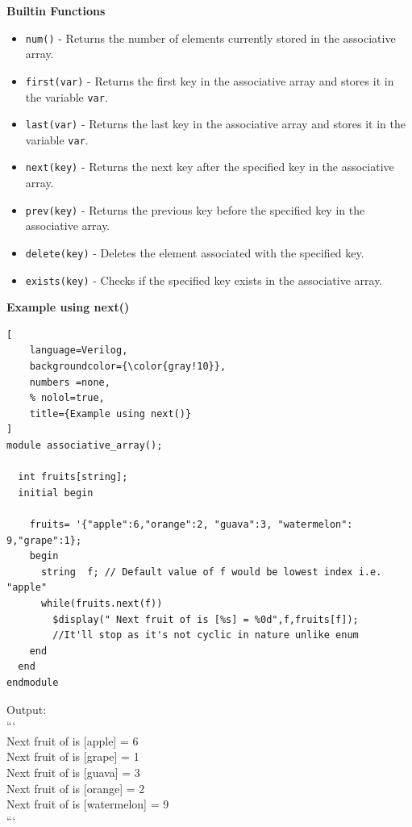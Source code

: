 \documentclass[12pt, a4paper]{article}
\begin{document}
\textbf{Builtin Functions}
\vspace{0.2em}
\begin{itemize}[nosep]
    \item \texttt{num()} - Returns the number of elements currently stored in the associative array.
    \item \texttt{first(var)} - Returns the first key in the associative array and stores it in the variable \texttt{var}.
    \item \texttt{last(var)} - Returns the last key in the associative array and stores it in the variable \texttt{var}.
    \item \texttt{next(key)} - Returns the next key after the specified key in the associative array.
    \item \texttt{prev(key)} - Returns the previous key before the specified key in the associative array.
    \item \texttt{delete(key)} - Deletes the element associated with the specified key.
    \item \texttt{exists(key)} - Checks if the specified key exists in the associative array.
\end{itemize}

\textbf{Example using next()}

\begin{lstlisting}[
    language=Verilog,
    backgroundcolor={\color{gray!10}},
    numbers =none,
    % nolol=true,
    title={Example using next()}
]
module associative_array();

  int fruits[string];  
  initial begin
    
    fruits= '{"apple":6,"orange":2, "guava":3, "watermelon": 9,"grape":1};
    begin
      string  f; // Default value of f would be lowest index i.e. "apple"
      while(fruits.next(f))
        $display(" Next fruit of is [%s] = %0d",f,fruits[f]);
        //It'll stop as it's not cyclic in nature unlike enum
    end
  end
endmodule
\end{lstlisting}

Output:\\
``` \\
  Next fruit of is [apple] = 6 \\
  Next fruit of is [grape] = 1 \\
  Next fruit of is [guava] = 3 \\
  Next fruit of is [orange] = 2 \\
  Next fruit of is [watermelon] = 9 \\
```
\end{document}
